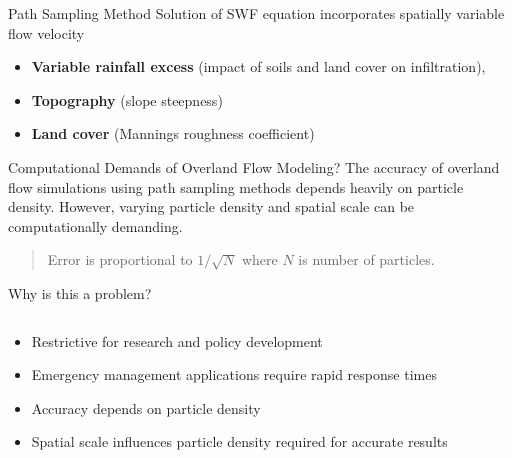 \documentclass[
  ignorenonframetext,
]{beamer}
\providecommand{\tightlist}{%
  \setlength{\itemsep}{0pt}\setlength{\parskip}{0pt}}\usepackage{longtable,booktabs,array}
\begin{document}
\begin{frame}
\begin{block}{Path Sampling Method}
\label{path-sampling-method}
Solution of SWF equation incorporates spatially variable flow velocity

\begin{itemize}
\tightlist
\item
  \textbf{Variable rainfall excess} (impact of soils and land cover on
  infiltration),
\item
  \textbf{Topography} (slope steepness)
\item
  \textbf{Land cover} (Mannings roughness coefficient)
\end{itemize}
\end{block}

\begin{block}{Computational Demands of Overland Flow Modeling?}
\label{computational-demands-of-overland-flow-modeling}
The accuracy of overland flow simulations using path sampling methods
depends heavily on particle density. However, varying particle density
and spatial scale can be computationally demanding.

\begin{quote}
Error is proportional to \(1/\sqrt{N}\) where \(N\) is number of
particles.
\end{quote}
\end{block}

\begin{block}{Why is this a problem?}
\label{why-is-this-a-problem}
\begin{columns}[T]
\begin{column}{0.5\textwidth}
\begin{itemize}
\tightlist
\item
  Restrictive for research and policy development
\end{itemize}

\begin{itemize}
\tightlist
\item
  Emergency management applications require rapid response times
\end{itemize}

\begin{itemize}
\tightlist
\item
  Accuracy depends on particle density
\end{itemize}

\begin{itemize}
\tightlist
\item
  Spatial scale influences particle density required for accurate
  results
\end{itemize}
\end{column}


\end{columns}
\end{block}
\end{frame}
\end{document}
